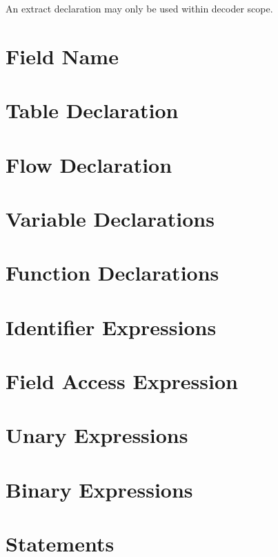 An extract declaration may only be used within decoder scope.

\section{Field Name} \label{field_name}

\section{Table Declaration} \label{table_guide}

\section{Flow Declaration} \label{flow_guide}

\section{Variable Declarations} \label{variable_guide}

\section{Function Declarations} \label{function_guide}

\section{Identifier Expressions} \label{id_expr_guide}

\section{Field Access Expression} \label{field_access_expr_guide}

\section{Unary Expressions} \label{unary_expr_guide}

\section{Binary Expressions} \label{binary_expr_guide}

\section{Statements} \label{statements_guide}


